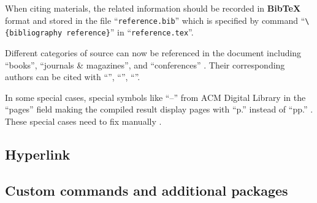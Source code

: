 When citing materials, the related information should be recorded in \textbf{BibTeX} format and stored in the file \enquote{\texttt{reference.bib}} which is specified by command \enquote{\texttt{\textbackslash\{bibliography reference\}}} in \enquote{\texttt{reference.tex}}.

Different categories of source can now be referenced in the document including \enquote{books}, \enquote{journals \& magazines}, and \enquote{conferences} \cite{10614682,10556316,9845195}. Their corresponding authors can be cited with \enquote{\citeauthor{10614682}}, \enquote{\citeauthor{10556316}}, \enquote{\citeauthor{9845195}}.

In some special cases, special symbols like \enquote{–} from ACM Digital Library in the \enquote{pages} field making the compiled result display pages with \enquote{p.} instead of \enquote{pp.} \cite{10.1145/3634737.3665024}. These special cases need to fix manually \cite{10.1145/3634737.3665024mod}.

\subsection{Hyperlink}
\subsection{Custom commands and additional packages}

\clearpage
